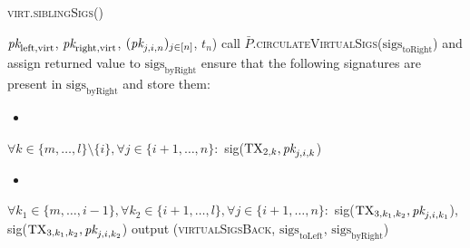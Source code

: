 \begin{center}
\begin{processbox}{\textsc{virt.siblingSigs}()}
\begin{algorithmic}[1]
        $\textit{pk}_{\mathrm{left}, \mathrm{virt}}$, $\textit{pk}_{\mathrm{right},
        \mathrm{virt}}$, $(\textit{pk}_{j, i, n})_{j \in [n]}$, $t_n$)
      \EndIf
      \Statex
      \State call
      $\bar{P}$.\textsc{circulateVirtualSigs}($\mathrm{sigs}_{\mathrm{toRight}}$)
      and assign returned value to $\mathrm{sigs}_{\mathrm{byRight}}$
      \State ensure that the following signatures are present in
      $\mathrm{sigs}_{\mathrm{byRight}}$ and store them:
      \begin{itemize}
        \item {}
      \end{itemize}
      \Indent
        \State $\forall k \in \{m, \dots, l\} \setminus \{i\}, \forall j \in
        \{i+1, \dots, n\}:$
        \Indent
          \State sig($\mathrm{TX}_{2, k}, \textit{pk}_{j, i, k}$)
        \EndIndent
      \EndIndent
      \begin{itemize}
        \item {}
      \end{itemize}
      \Indent
        \State $\forall k_1 \in \{m, \dots, i-1\}, \forall k_2 \in \{i+1, \dots,
        l\}, \forall j \in \{i+1, \dots, n\}:$
        \Indent
          \State sig($\mathrm{TX}_{3, k_1, k_2}, \textit{pk}_{j, i, k_1}$),
          sig($\mathrm{TX}_{3, k_1, k_2}, \textit{pk}_{j, i, k_2}$)
        \EndIndent
      \EndIndent
      \State output (\textsc{virtualSigsBack},
      $\mathrm{sigs}_{\mathrm{toLeft}}$, $\mathrm{sigs}_{\mathrm{byRight}}$)
    \end{algorithmic}
  \end{processbox}
  \label{code:virtual-layer:sibling-sigs}
\end{center}

